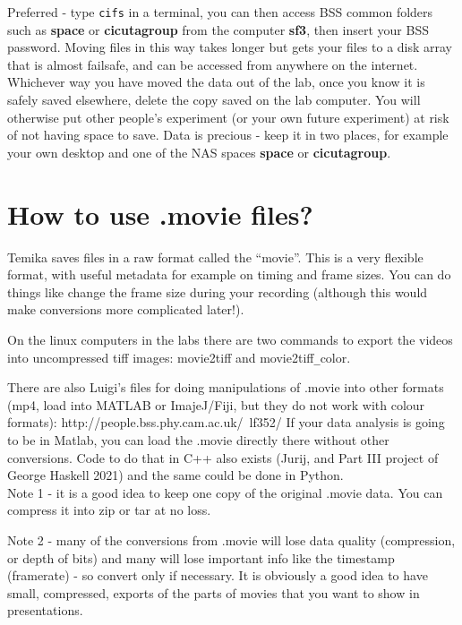 \documentclass{report}
\begin{document}
Preferred - type \verb|cifs| in a  terminal,  you can then access BSS common folders such as \textbf{space} or \textbf{cicutagroup} from the computer \textbf{sf3}, then insert your BSS password. Moving files in this way takes longer but gets your files to a disk array that is almost failsafe, and can be accessed from anywhere on the internet.\\

Whichever way you have moved the data out of the lab, once you know it is safely saved elsewhere, delete the copy saved on the lab computer.   You will otherwise put other people's experiment (or your own future experiment) at risk of not having space to save.    Data is precious - keep it in two places, for example your own desktop and one of the NAS spaces \textbf{space} or \textbf{cicutagroup}.


\section{How to use .movie files?}
Temika saves files in a raw format called the ``movie''.   This is a very flexible format, with useful metadata for example on timing and frame sizes.   You can do things like change the frame size during your recording (although this would make conversions more complicated later!).


On the linux computers in the labs there are two commands to export the videos into uncompressed tiff images: movie2tiff and movie2tiff\verb|_|color.

There are also  Luigi’s files for doing manipulations of .movie into other formats (mp4, load into MATLAB or ImajeJ/Fiji, but they do not work with colour formats): http://people.bss.phy.cam.ac.uk/~lf352/      If your data analysis is going to be in Matlab, you can load the .movie directly there without other conversions. Code to do that in C++ also exists (Jurij, and Part III project of George Haskell 2021) and the same could be done in Python.\\

Note 1 - it is a good idea to keep one copy of the original .movie data.   You can compress it into zip or tar at no loss.

Note 2 -  many of the conversions from .movie will lose data quality (compression, or depth of bits) and many will lose important info like the timestamp (framerate) - so convert only if necessary.      It is obviously a good idea to have small, compressed, exports of the parts of movies that you want to show in presentations.
\end{document}
